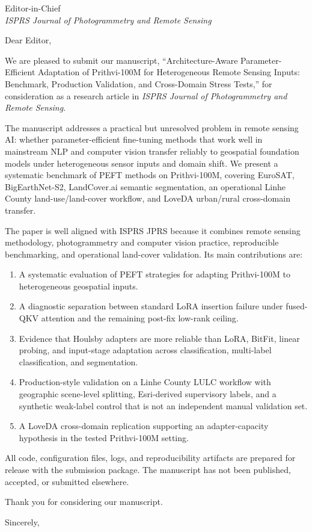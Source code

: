 \documentclass[11pt]{letter}
\begin{document}
\begin{letter}{Editor-in-Chief \\ \emph{ISPRS Journal of Photogrammetry and Remote Sensing}}

\opening{Dear Editor,}

We are pleased to submit our manuscript, ``Architecture-Aware Parameter-Efficient Adaptation of Prithvi-100M for Heterogeneous Remote Sensing Inputs: Benchmark, Production Validation, and Cross-Domain Stress Tests,'' for consideration as a research article in \emph{ISPRS Journal of Photogrammetry and Remote Sensing}.

The manuscript addresses a practical but unresolved problem in remote sensing AI: whether parameter-efficient fine-tuning methods that work well in mainstream NLP and computer vision transfer reliably to geospatial foundation models under heterogeneous sensor inputs and domain shift. We present a systematic benchmark of PEFT methods on Prithvi-100M, covering EuroSAT, BigEarthNet-S2, LandCover.ai semantic segmentation, an operational Linhe County land-use/land-cover workflow, and LoveDA urban/rural cross-domain transfer.

The paper is well aligned with ISPRS JPRS because it combines remote sensing methodology, photogrammetry and computer vision practice, reproducible benchmarking, and operational land-cover validation. Its main contributions are:

\begin{enumerate}
  \item A systematic evaluation of PEFT strategies for adapting Prithvi-100M to heterogeneous geospatial inputs.
  \item A diagnostic separation between standard LoRA insertion failure under fused-QKV attention and the remaining post-fix low-rank ceiling.
  \item Evidence that Houlsby adapters are more reliable than LoRA, BitFit, linear probing, and input-stage adaptation across classification, multi-label classification, and segmentation.
  \item Production-style validation on a Linhe County LULC workflow with geographic scene-level splitting, Esri-derived supervisory labels, and a synthetic weak-label control that is not an independent manual validation set.
  \item A LoveDA cross-domain replication supporting an adapter-capacity hypothesis in the tested Prithvi-100M setting.
\end{enumerate}

All code, configuration files, logs, and reproducibility artifacts are prepared for release with the submission package. The manuscript has not been published, accepted, or submitted elsewhere.

Thank you for considering our manuscript.

\closing{Sincerely,}

\end{letter}
\end{document}
